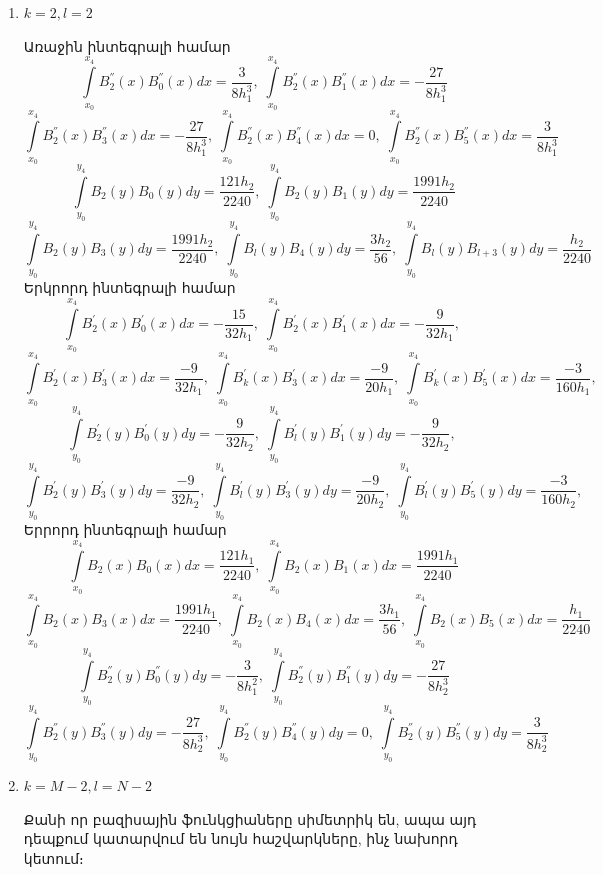 \documentclass[fleqn, bachelor,subf,12pt,notitlepage]{disser}
\begin{document}
\begin{enumerate}
\item{$k=2,  l =2 $}

Առաջին ինտեգրալի համար
$$\int \limits_{x_{0}}^{x_{4}}B_{2}^{''}(x)B_{0}^{''}(x)dx = \dfrac{3}{8h_{1}^3}, \; \int \limits_{x_{0}}^{x_{4}}B_{2}^{''}(x)B_{1}^{''}(x)dx = -\dfrac{27}{8h_{1}^3}$$
$$\int \limits_{x_{0}}^{x_{4}}B_{2}^{''}(x)B_{3}^{''}(x)dx =-\dfrac{27}{8h_{1}^3}, \; \int \limits_{x_{0}}^{x_{4}}B_{2}^{''}(x)B_{4}^{''}(x)dx = 0, \; \int \limits_{x_{0}}^{x_{4}}B_{2}^{''}(x)B_{5}^{''}(x)dx =  \dfrac{3}{8h_{1}^3}$$
$$ \int \limits_{y_{0}}^{y_{4}}B_{2}(y)B_{0}(y)dy=\dfrac{121h_{2}}{2240}, \; \int \limits_{y_{0}}^{y_{4}}B_{2}(y)B_{1}(y)dy=\dfrac{1991h_{2}}{2240}$$
$$\int \limits_{y_{0}}^{y_{4}}B_{2}(y)B_{3}(y)dy=\dfrac{1991h_{2}}{2240}, \; \int \limits_{y_{0}}^{y_{4}}B_{l}(y)B_{4}(y)dy=\dfrac{3h_{2}}{56}, \; \int \limits_{y_{0}}^{y_{4}}B_{l}(y)B_{l+3}(y)dy=\dfrac{h_{2}}{2240}$$
Երկրորդ ինտեգրալի համար
$$\int \limits_{x_{0}}^{x_{4}}B_{2}^{'}(x)B_{0}^{'}(x)dx=-\dfrac{15}{32h_{1}}, \; \int \limits_{x_{0}}^{x_{4}}B_{2}^{'}(x)B_{1}^{'}(x)dx=-\dfrac{9}{32h_{1}}, \;$$
$$\int \limits_{x_{0}}^{x_{4}}B_{2}^{'}(x)B_{3}^{'}(x)dx=\dfrac{-9}{32h_{1}}, \; \int \limits_{x_{0}}^{x_{4}}B_{k}^{'}(x)B_{3}^{'}(x)dx=\dfrac{-9}{20h_{1}}, \; \int \limits_{x_{0}}^{x_{4}}B_{k}^{'}(x)B_{5}^{'}(x)dx=\dfrac{-3}{160h_{1}}, \;$$
$$\int \limits_{y_{0}}^{y_{4}}B_{2}^{'}(y)B_{0}^{'}(y)dy=-\dfrac{9}{32h_{2}}, \; \int \limits_{y_{0}}^{y_{4}}B_{l}^{'}(y)B_{1}^{'}(y)dy=-\dfrac{9}{32h_{2}}, \;$$
$$\int \limits_{y_{0}}^{y_{4}}B_{2}^{'}(y)B_{3}^{'}(y)dy=\dfrac{-9}{32h_{2}}, \; \int \limits_{y_{0}}^{y_{4}}B_{l}^{'}(y)B_{3}^{'}(y)dy=\dfrac{-9}{20h_{2}}, \; \int \limits_{y_{0}}^{y_{4}}B_{l}^{'}(y)B_{5}^{'}(y)dy=\dfrac{-3}{160h_{2}}, \;$$
Երրորդ ինտեգրալի համար
$$\int \limits_{x_{0}}^{x_{4}}B_{2}(x)B_{0}(x)dx=\dfrac{121h_{1}}{2240}, \; \int \limits_{x_{0}}^{x_{4}}B_{2}(x)B_{1}(x)dx=\dfrac{1991h_{1}}{2240}$$
$$\int \limits_{x_{0}}^{x_{4}}B_{2}(x)B_{3}(x)dx=\dfrac{1991h_{1}}{2240}, \; \int \limits_{x_{0}}^{x_{4}}B_{2}(x)B_{4}(x)dx=\dfrac{3h_{1}}{56}, \; \int \limits_{x_{0}}^{x_{4}}B_{2}(x)B_{5}(x)dx=\dfrac{h_{1}}{2240}$$
$$\int \limits_{y_{0}}^{y_{4}}B_{2}^{''}(y)B_{0}^{''}(y)dy = -\dfrac{3}{8h_{1}^{2}}, \; \int \limits_{y_{0}}^{y_{4}}B_{2}^{''}(y)B_{1}^{''}(y)dy = -\dfrac{27}{8h_{2}^3}$$
$$\int \limits_{y_{0}}^{y_{4}}B_{2}^{''}(y)B_{3}^{''}(y)dy =-\dfrac{27}{8h_{2}^3}, \; \int \limits_{y_{0}}^{y_{4}}B_{2}^{''}(y)B_{4}^{''}(y)dy = 0, \; \int \limits_{y_{0}}^{y_{4}}B_{2}^{''}(y)B_{5}^{''}(y)dy =  \dfrac{3}{8h_{2}^3}$$

\item{$k=M-2, l=N-2$}

Քանի որ բազիսային ֆունկցիաները սիմետրիկ են, ապա այդ դեպքում կատարվում են նույն հաշվարկները, ինչ նախորդ կետում։
\end{enumerate}
\end{document}
